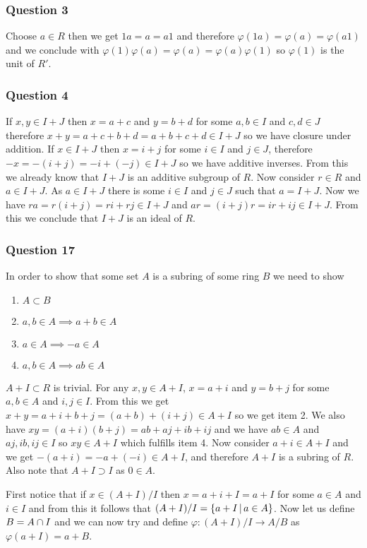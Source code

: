 \documentclass{article}
\begin{document}
\subsubsection{Question 3}

Choose $a\in R$ then we get $1a=a=a1$ and therefore $\varphi(1a) = \varphi(a) = \varphi(a1)$ and we conclude with $\varphi(1)\varphi(a) =\varphi(a) = \varphi(a)\varphi(1)$ so $\varphi(1)$ is the unit of $R'$.

\subsubsection{Question 4}
If $x,y \in I+J$ then $x = a+c$ and $y=b+d$ for some $a,b\in I$ and $c,d \in J$ therefore $x+y = a+c+b+d = a+b+c+d \in I+J$ so we have closure under addition. If $x\in I+J$ then $x=i+j$ for some $i\in I$ and $j\in J$, therefore $-x = -(i+j) = -i+(-j) \in I+J$ so we have additive inverses. From this we already know that $I+J$ is an additive subgroup of $R$. Now consider $r \in R$ and $a \in I+J$. As $a\in I+J$ there is some $i\in I$ and $j\in J$ such that $a=I+J$. Now we have $ra = r(i+j) = ri + rj \in I+J$ and $ar = (i+j)r = ir+ij \in I+J$. From this we conclude that $I+J$ is an ideal of $R$.

\subsubsection{Question 17}

In order to show that some set $A$ is a subring of some ring $B$ we need to show
\begin{enumerate}
	\item $A\subset B$
	\item $a,b\in A \implies a+b\in A$
	\item $a\in A \implies -a \in A$
	\item $a,b\in A \implies ab \in A$
\end{enumerate}

$A+I \subset R$ is trivial. For any $x,y\in A+I$, $x = a+i$ and $y=b+j$ for some $a,b\in A$ and $i,j\in I$. From this we get $x+y = a+i+b+j = (a+b)+(i+j) \in A+I$ so we get item 2. We also have $xy = (a+i)(b+j) = ab+aj+ib+ij$ and we have $ab \in A$ and $aj,ib,ij\in I$ so $xy \in A+I$ which fulfills item 4. Now consider $a+i \in A+I$ and we get $-(a+i) = -a+(-i) \in A+I$, and therefore $A+I$ is a subring of $R$. Also note that $A+I\supset I$ as $0 \in A$.


First notice that if $x \in (A+I)/I$ then $x = a + i + I = a + I$ for some $a\in A$ and $i \in I$ and from this it follows that $(A+I)/I = \left\{{a+I} \,\middle|\, {a \in A}\right\}$. Now let us define $B = A\cap I$ and we can now try and define $\varphi:(A+I)/I \to A/B$ as $\varphi(a+I) = a + B$.
\end{document}
